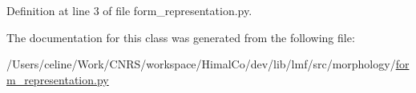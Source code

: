Definition at line 3 of file form\+\_\+representation.\+py.



The documentation for this class was generated from the following file\+:\begin{DoxyCompactItemize}
\item 
/\+Users/celine/\+Work/\+C\+N\+R\+S/workspace/\+Himal\+Co/dev/lib/lmf/src/morphology/\hyperlink{morphology_2form__representation_8py}{form\+\_\+representation.\+py}\end{DoxyCompactItemize}
